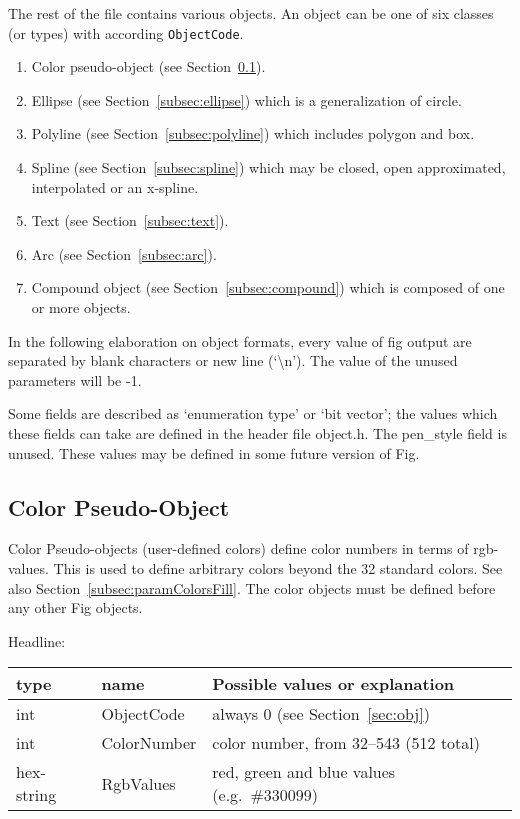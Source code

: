 \documentclass[10pt, a4paper]{article}
\begin{document}
The rest of the file contains various objects.  
An object can be one of six classes (or types) with according \texttt{ObjectCode}.
%
\begin{enumerate}
\item[0]
Color pseudo-object (see Section~\ref{subsec:colorPseudoObj}). 
\item
Ellipse (see Section~\ref{subsec:ellipse}) which is a generalization of circle.
\item
Polyline (see Section~\ref{subsec:polyline}) which includes polygon and box.
\item
Spline (see Section~\ref{subsec:spline}) 
which may be closed, open approximated, interpolated or an x-spline.
\item
Text (see Section~\ref{subsec:text}).
\item
Arc (see Section~\ref{subsec:arc}).
\item
Compound object (see Section~\ref{subsec:compound}) 
which is composed of one or more objects. 
\end{enumerate}

In the following elaboration on object formats, 
every value of fig output are separated by blank characters 
or new line (`\textbackslash{}n').  
The value of the unused parameters will be -1.

 Some fields are described as `enumeration type' or `bit vector'; the
 values which these fields can take are defined in the header file object.h.
 The pen\_style field is unused.
 These values may be defined in some future version of Fig.


\setcounter{subsection}{-1}
\subsection{Color Pseudo-Object}\label{subsec:colorPseudoObj}

Color Pseudo-objects (user-defined colors) 
define color numbers in terms of rgb-values. 
This is used to define arbitrary colors beyond the 32 standard colors. 
See also Section~\ref{subsec:paramColorsFill}. 
The color objects must be defined before any other Fig objects.

\noindent
Headline: \\
%
\begin{tabular}{lll}
\toprule
type & name & Possible values or explanation \\
\midrule
\midrule
int        & ObjectCode  & always 0 (see Section~\ref{sec:obj}) \\
int        & ColorNumber & color number, from 32--543 (512 total)\\
hex-string & RgbValues   & red, green and blue values (e.g.~\#330099) \\
\bottomrule
\end{tabular}
\end{document}
